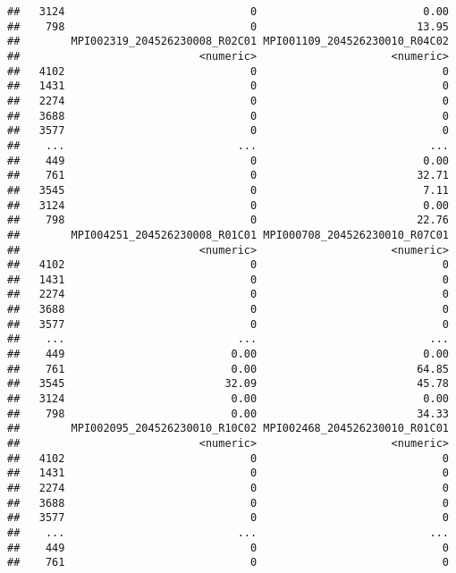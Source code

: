 \documentclass[
]{article}
\begin{document}
\begin{verbatim}
##   3124                             0                          0.00
##    798                             0                         13.95
##        MPI002319_204526230008_R02C01 MPI001109_204526230010_R04C02
##                            <numeric>                     <numeric>
##   4102                             0                             0
##   1431                             0                             0
##   2274                             0                             0
##   3688                             0                             0
##   3577                             0                             0
##    ...                           ...                           ...
##    449                             0                          0.00
##    761                             0                         32.71
##   3545                             0                          7.11
##   3124                             0                          0.00
##    798                             0                         22.76
##        MPI004251_204526230008_R01C01 MPI000708_204526230010_R07C01
##                            <numeric>                     <numeric>
##   4102                             0                             0
##   1431                             0                             0
##   2274                             0                             0
##   3688                             0                             0
##   3577                             0                             0
##    ...                           ...                           ...
##    449                          0.00                          0.00
##    761                          0.00                         64.85
##   3545                         32.09                         45.78
##   3124                          0.00                          0.00
##    798                          0.00                         34.33
##        MPI002095_204526230010_R10C02 MPI002468_204526230010_R01C01
##                            <numeric>                     <numeric>
##   4102                             0                             0
##   1431                             0                             0
##   2274                             0                             0
##   3688                             0                             0
##   3577                             0                             0
##    ...                           ...                           ...
##    449                             0                             0
##    761                             0                             0

\end{verbatim}
\end{document}
